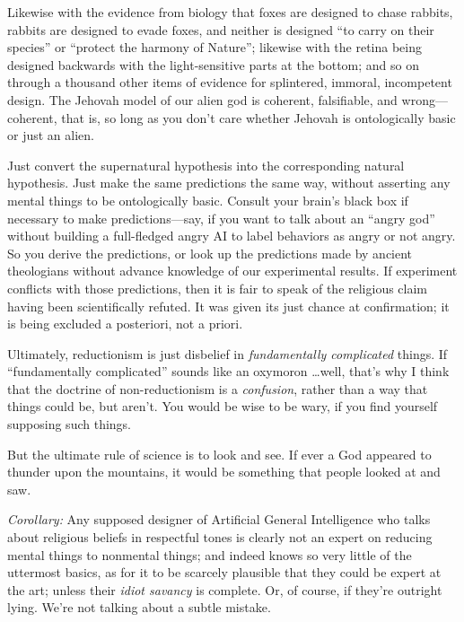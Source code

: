 {
 Likewise with the evidence from biology that foxes are designed to
chase rabbits, rabbits are designed to evade foxes, and neither is
designed ``to carry on their
species'' or ``protect the harmony
of Nature''; likewise with the retina being designed
backwards with the light-sensitive parts at the bottom; and so on
through a thousand other items of evidence for splintered, immoral,
incompetent design. The Jehovah model of our alien god is coherent,
falsifiable, and wrong---coherent, that is, so long as you
don't care whether Jehovah is ontologically basic or
just an alien.}

{
 Just convert the supernatural hypothesis into the corresponding
natural hypothesis. Just make the same predictions the same way,
without asserting any mental things to be ontologically basic. Consult
your brain's black box if necessary to make
predictions---say, if you want to talk about an
``angry god'' without building a
full-fledged angry AI to label behaviors as angry or not angry. So you
derive the predictions, or look up the predictions made by ancient
theologians without advance knowledge of our experimental results. If
experiment conflicts with those predictions, then it is fair to speak
of the religious claim having been scientifically refuted. It was given
its just chance at confirmation; it is being excluded a posteriori, not
a priori.}

{
 Ultimately, reductionism is just disbelief in
\textit{fundamentally complicated} things. If
``fundamentally complicated'' sounds
like an oxymoron \ldots well, that's why I think that
the doctrine of non-reductionism is a \textit{confusion}, rather than a
way that things could be, but aren't. You would be wise
to be wary, if you find yourself supposing such things.}

{
 But the ultimate rule of science is to look and see. If ever a God
appeared to thunder upon the mountains, it would be something that
people looked at and saw.}

{
 \textit{Corollary:} Any supposed designer of Artificial General
Intelligence who talks about religious beliefs in respectful tones is
clearly not an expert on reducing mental things to nonmental things;
and indeed knows so very little of the uttermost basics, as for it to
be scarcely plausible that they could be expert at the art; unless
their \textit{idiot savancy} is complete. Or, of course, if
they're outright lying. We're not
talking about a subtle mistake.}

\myendsectiontext

